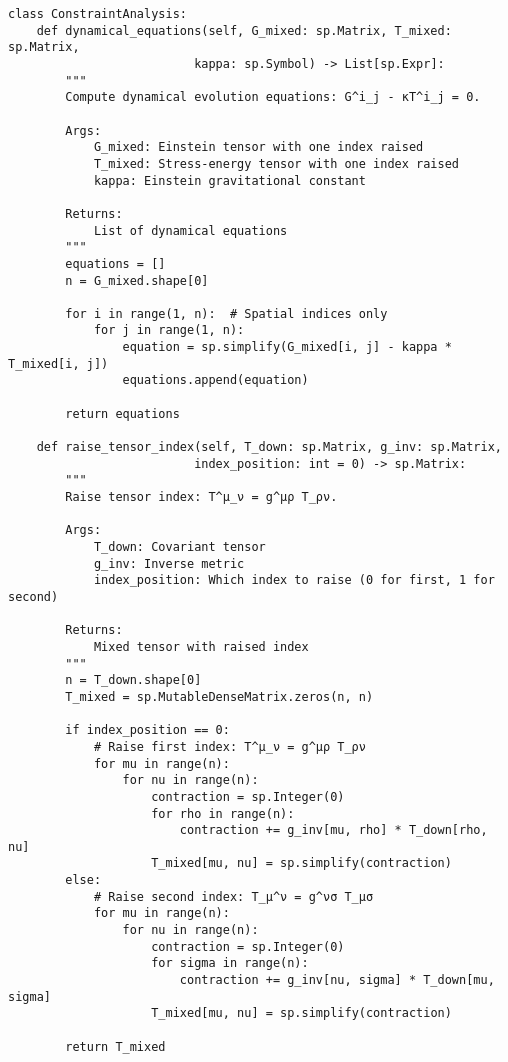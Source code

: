 \documentclass[11pt,a4paper]{article}
\theoremstyle{definition}
\theoremstyle{remark}
\begin{document}
\begin{lstlisting}
class ConstraintAnalysis:
    def dynamical_equations(self, G_mixed: sp.Matrix, T_mixed: sp.Matrix,
                          kappa: sp.Symbol) -> List[sp.Expr]:
        """
        Compute dynamical evolution equations: G^i_j - κT^i_j = 0.
        
        Args:
            G_mixed: Einstein tensor with one index raised
            T_mixed: Stress-energy tensor with one index raised
            kappa: Einstein gravitational constant
            
        Returns:
            List of dynamical equations
        """
        equations = []
        n = G_mixed.shape[0]
        
        for i in range(1, n):  # Spatial indices only
            for j in range(1, n):
                equation = sp.simplify(G_mixed[i, j] - kappa * T_mixed[i, j])
                equations.append(equation)
        
        return equations
    
    def raise_tensor_index(self, T_down: sp.Matrix, g_inv: sp.Matrix, 
                          index_position: int = 0) -> sp.Matrix:
        """
        Raise tensor index: T^μ_ν = g^μρ T_ρν.
        
        Args:
            T_down: Covariant tensor
            g_inv: Inverse metric
            index_position: Which index to raise (0 for first, 1 for second)
            
        Returns:
            Mixed tensor with raised index
        """
        n = T_down.shape[0]
        T_mixed = sp.MutableDenseMatrix.zeros(n, n)
        
        if index_position == 0:
            # Raise first index: T^μ_ν = g^μρ T_ρν
            for mu in range(n):
                for nu in range(n):
                    contraction = sp.Integer(0)
                    for rho in range(n):
                        contraction += g_inv[mu, rho] * T_down[rho, nu]
                    T_mixed[mu, nu] = sp.simplify(contraction)
        else:
            # Raise second index: T_μ^ν = g^νσ T_μσ  
            for mu in range(n):
                for nu in range(n):
                    contraction = sp.Integer(0)
                    for sigma in range(n):
                        contraction += g_inv[nu, sigma] * T_down[mu, sigma]
                    T_mixed[mu, nu] = sp.simplify(contraction)
        
        return T_mixed
\end{lstlisting}
\end{document}
